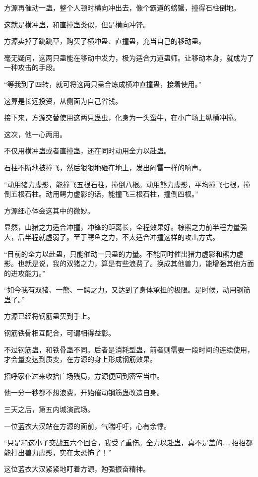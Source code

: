 \begin{this_body}
方源再催动一蛊，整个人顿时横向冲出去，像个霸道的螃蟹，撞得石柱倒地。

这就是横冲蛊，和直撞蛊类似，但是横向冲锋。

方源卖掉了跳跳草，购买了横冲蛊、直撞蛊，充当自己的移动蛊。

毫无疑问，这两只蛊能在移动中发力，极为适合力道蛊师。让移动本身，就成为了一种攻击的手段。

“等我到了四转，就可将这两只蛊合炼成横冲直撞蛊，接着使用。”

这算是长远投资，从侧面为自己省钱。

接下来，方源交替使用这两只蛊虫，化身为一头蛮牛，在小广场上纵横冲撞。

这次，他一心两用。

不仅用横冲蛊或者直撞蛊，还在同时动用全力以赴蛊。

石柱不断地被撞飞，然后狠狠地砸在地上，发出闷雷一样的响声。

“动用猪力虚影，能撞飞五根石柱，撞倒八根。动用熊力虚影，平均撞飞七根，撞倒五根石柱。动用鳄力虚影的话，能撞飞三根石柱，撞倒四根。”

方源细心体会这其中的微妙。

显然，山猪之力适合冲撞，冲锋的距离长，全程效果好。棕熊之力前半程力量强大，后半程就虚弱了。至于鳄鱼之力，不太适合冲撞这样的攻击方式。

“目前的全力以赴蛊，只能催动一只蛊的力量。不能同时催出猪力虚影和熊力虚影。也就是说，我的双猪之力，算是有些浪费了。换成其他兽力，能增强其他方面的进攻能力。”

“如今我有双猪、一熊、一鳄之力，又达到了身体承担的极限。是时候，动用钢筋蛊了。”

方源已经将钢筋蛊买到手上。

钢筋铁骨相互配合，可谓相得益彰。

不过钢筋蛊，和铁骨蛊不同。后者是消耗型蛊，前者则需要一段时间的连续使用，才会量变达到质变，在方源的身上形成钢筋效果。

招呼家仆过来收拾广场残局，方源便回到密室当中。

他一分一秒都不想浪费，开始催动钢筋蛊改造自身。

三天之后，第五内城演武场。

一位蓝衣大汉站在方源的面前，气喘吁吁，心有余悸。

“只是和这小子交战五六个回合，我受了重伤。全力以赴蛊，真不是盖的……招招都能打出兽力虚影，实在太恐怖了！”

这位蓝衣大汉紧紧地盯着方源，勉强振奋精神。


\end{this_body}
